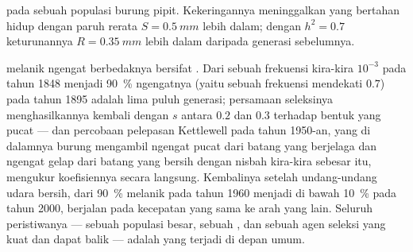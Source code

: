 \begin{omfigure}

{\small {} pada sebuah populasi burung pipit.
Kekeringannya meninggalkan yang bertahan hidup dengan paruh rerata $S = \qty{0.5}{mm}$ lebih dalam; dengan $h^{2} = 0.7$ keturunannya
$R = \qty{0.35}{mm}$ lebih dalam daripada generasi sebelumnya.}
\end{omfigure}

\begin{example}\label{ex:b2:population-genetics:moth}
 melanik ngengat berbedaknya bersifat . Dari sebuah
frekuensi kira-kira $10^{-3}$ pada tahun 1848 menjadi \qty{90}{\%}
ngengatnya (yaitu sebuah frekuensi mendekati $0.7$) pada tahun 1895
adalah lima puluh generasi; persamaan seleksinya menghasilkannya
kembali dengan $s$ antara $0.2$ dan $0.3$ terhadap bentuk yang pucat
--- dan percobaan pelepasan Kettlewell pada tahun 1950-an, yang di
dalamnya burung mengambil ngengat pucat dari batang yang berjelaga dan
ngengat gelap dari batang yang bersih dengan nisbah kira-kira sebesar
itu, mengukur koefisiennya secara langsung. Kembalinya setelah
undang-undang udara bersih, dari \qty{90}{\%} melanik pada tahun 1960
menjadi di bawah \qty{10}{\%} pada tahun 2000, berjalan pada kecepatan
yang sama ke arah yang lain. Seluruh peristiwanya --- sebuah populasi
besar, sebuah  , dan sebuah agen seleksi yang kuat dan dapat
balik --- adalah  yang terjadi di depan umum.
\end{example}

